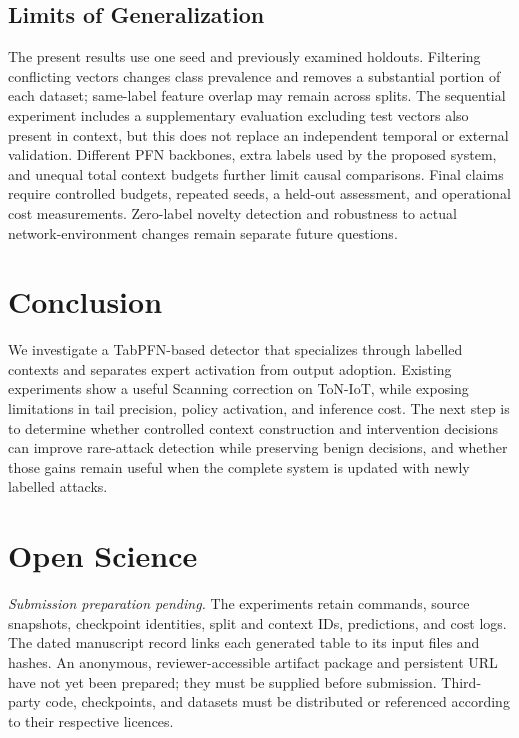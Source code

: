 \documentclass[sigconf,anonymous,pbalance]{acmart}
\begin{document}
\subsection{Limits of Generalization}
The present results use one seed and previously examined holdouts. Filtering conflicting vectors changes class prevalence and removes a substantial portion of each dataset; same-label feature overlap may remain across splits. The sequential experiment includes a supplementary evaluation excluding test vectors also present in context, but this does not replace an independent temporal or external validation. Different PFN backbones, extra labels used by the proposed system, and unequal total context budgets further limit causal comparisons. Final claims require controlled budgets, repeated seeds, a held-out assessment, and operational cost measurements. Zero-label novelty detection and robustness to actual network-environment changes remain separate future questions.

\section{Conclusion}
We investigate a TabPFN-based detector that specializes through labelled contexts and separates expert activation from output adoption. Existing experiments show a useful Scanning correction on ToN-IoT, while exposing limitations in tail precision, policy activation, and inference cost. The next step is to determine whether controlled context construction and intervention decisions can improve rare-attack detection while preserving benign decisions, and whether those gains remain useful when the complete system is updated with newly labelled attacks.




\appendix
\section{Open Science}
\label{app:open-science}
\textit{Submission preparation pending.} The experiments retain commands, source snapshots, checkpoint identities, split and context IDs, predictions, and cost logs. The dated manuscript record links each generated table to its input files and hashes. An anonymous, reviewer-accessible artifact package and persistent URL have not yet been prepared; they must be supplied before submission. Third-party code, checkpoints, and datasets must be distributed or referenced according to their respective licences.
\end{document}
